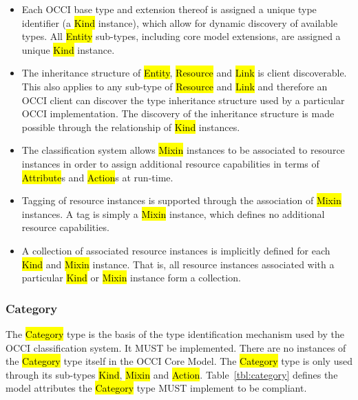 \documentclass[10pt,a4paper]{article}
\begin{document}
\begin{itemize}
  \item Each OCCI base type and extension thereof is assigned a unique
    type identifier (a \hl{Kind} instance), which allow for dynamic
    discovery of available types. All \hl{Entity} sub-types, including
    core model extensions, are assigned a unique \hl{Kind} instance.

  \item The inheritance structure of \hl{Entity}, \hl{Resource} and
    \hl{Link} is client discoverable. This also applies to any
    sub-type of \hl{Resource} and \hl{Link} and therefore an OCCI
    client can discover the type inheritance structure used by a
    particular OCCI implementation. The discovery of the inheritance
    structure is made possible through the relationship of \hl{Kind}
    instances.

  \item The classification system allows \hl{Mixin} instances to be
    associated to resource instances in order to assign additional
    resource capabilities in terms of \hl{Attribute}s and \hl{Action}s at
    run-time.

  \item Tagging of resource instances is supported through the
    association of \hl{Mixin} instances. A tag is simply a \hl{Mixin}
    instance, which defines no additional resource capabilities.

  \item A collection of associated resource instances is implicitly
    defined for each \hl{Kind} and \hl{Mixin} instance. That is, all
    resource instances associated with a particular \hl{Kind} or
    \hl{Mixin} instance form a collection.
\end{itemize}

\subsubsection{Category}
\label{sec:category}
The \hl{Category} type is the basis of the type identification
mechanism used by the OCCI classification system. It MUST be
implemented.
There are no instances of the \hl{Category} type itself in the OCCI Core Model.
The \hl{Category} type is only used through its sub-types \hl{Kind}, \hl{Mixin}
and \hl{Action}.
%
Table~\ref{tbl:category} defines the model attributes the \hl{Category} type
MUST implement to be compliant.
\end{document}
